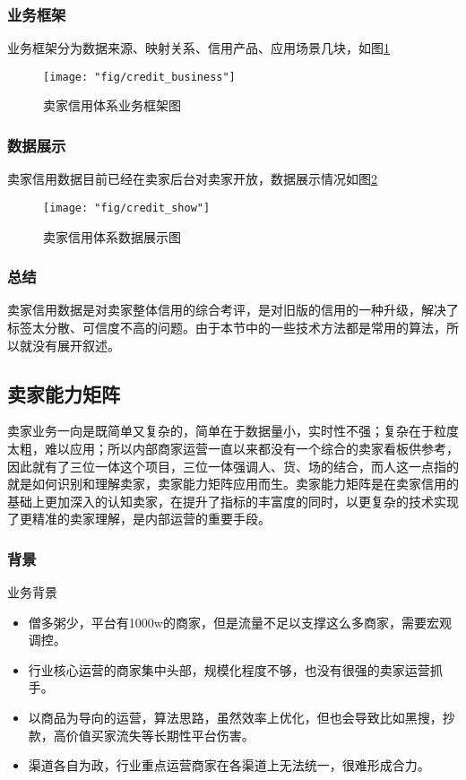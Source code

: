 \subsubsection{业务框架}
业务框架分为数据来源、映射关系、信用产品、应用场景几块，如图\ref{fig:credit_business}
\begin{figure}
	\centering
	\texttt{[image: "fig/credit\_business"]}
	\caption{卖家信用体系业务框架图}
	\label{fig:credit_business}
\end{figure}

\subsubsection{数据展示}
卖家信用数据目前已经在卖家后台对卖家开放，数据展示情况如图\ref{fig:credit_show}
\begin{figure}
	\centering
	\texttt{[image: "fig/credit\_show"]}
	\caption{卖家信用体系数据展示图}
	\label{fig:credit_show}
\end{figure}

\subsubsection{总结}
卖家信用数据是对卖家整体信用的综合考评，是对旧版的信用的一种升级，解决了标签太分散、可信度不高的问题。由于本节中的一些技术方法都是常用的算法，所以就没有展开叙述。


\subsection{卖家能力矩阵}

卖家业务一向是既简单又复杂的，简单在于数据量小，实时性不强；复杂在于粒度太粗，难以应用；所以内部商家运营一直以来都没有一个综合的卖家看板供参考，因此就有了三位一体这个项目，三位一体强调人、货、场的结合，而人这一点指的就是如何识别和理解卖家，卖家能力矩阵应用而生。卖家能力矩阵是在卖家信用的基础上更加深入的认知卖家，在提升了指标的丰富度的同时，以更复杂的技术实现了更精准的卖家理解，是内部运营的重要手段。

\subsubsection{背景}\label{ux80ccux666f}

业务背景

\begin{itemize}\setlength{\itemsep}{-6pt}
	\item
	僧多粥少，平台有1000w的商家，但是流量不足以支撑这么多商家，需要宏观调控。
	\item
	行业核心运营的商家集中头部，规模化程度不够，也没有很强的卖家运营抓手。
	\item
	以商品为导向的运营，算法思路，虽然效率上优化，但也会导致比如黑搜，抄款，高价值买家流失等长期性平台伤害。
	\item
	渠道各自为政，行业重点运营商家在各渠道上无法统一，很难形成合力。
\end{itemize}

